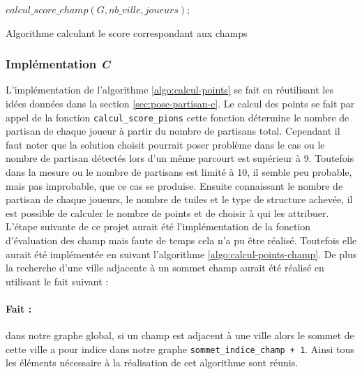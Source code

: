\documentclass[a4paper, 11pt]{article}
\begin{document}
			\begin{algorithm}[H]
			  \BlankLine
			  $calcul\_score\_champ(G, nb\_ville, joueurs);$
			  \caption{Algorithme calculant le score correspondant aux champs}
			  \label{algo:calcul-points-champ}
			\end{algorithm}

		\subsubsection{Implémentation \emph{C}}\label{sec:calcul-points-c}
			\indent L'implémentation de l'algorithme \ref{algo:calcul-points} se fait en réutilisant les idées données dans la section \ref{sec:pose-partisan-c}. Le calcul des points se fait par appel de la fonction \verb!calcul_score_pions! cette fonction détermine le nombre de partisan de chaque joueur à partir du nombre de partisans total. Cependant il faut noter que la solution choisit pourrait poser problème dans le cas ou le nombre de partisan détectés lors d'un même parcourt est supérieur à 9. Toutefois dans la mesure ou le nombre de partisans est limité à 10, il semble peu probable, mais pas improbable, que ce cas se produise. Ensuite connaissant le nombre de partisan de chaque joueurs, le nombre de tuiles et le type de structure achevée, il est possible de calculer le nombre de points et de choisir à qui les attribuer.\\

			\indent L'étape suivante de ce projet aurait été l'implémentation de la fonction d'évaluation des champ mais faute de temps cela n'a pu être réalisé. Toutefois elle aurait été implémentée en suivant l'algorithme \ref{algo:calcul-points-champ}. De plus la recherche d'une ville adjacente à un sommet champ aurait été réalisé en utilisant le fait suivant :
			\paragraph{Fait :} dans notre graphe global, si un champ est adjacent à une ville alors le sommet de cette ville a pour indice dans notre graphe \verb!sommet_indice_champ + 1!. 
			Ainsi tous les éléments nécessaire à la réalisation de cet algorithme sont réunis.
\end{document}
